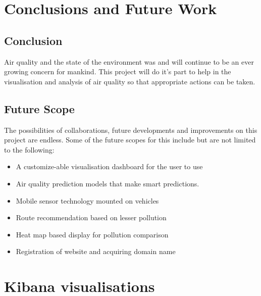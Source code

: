 \documentclass[]{report}
\begin{document}


\chapter{Conclusions and Future Work}
\section{Conclusion}
Air quality and the state of the environment was and will continue to be an ever growing concern for mankind. This project will do it's part to help in the visualisation and analysis of air quality so that appropriate actions can be taken.
\section{Future Scope}
The possibilities of collaborations, future developments and improvements on this project are endless. Some of the future scopes for this include but are not limited to the following:
\newline
\begin{itemize}
    \item A customize-able visualisation dashboard for the user to use
    \item Air quality prediction models that make smart predictions. 
    \item Mobile sensor technology mounted on vehicles 
    \item Route recommendation based on lesser pollution 
    \item Heat map based display for pollution comparison 
    \item Registration of website and acquiring domain name

\end{itemize}



 

\appendix 
\chapter{Kibana visualisations}
\end{document}
